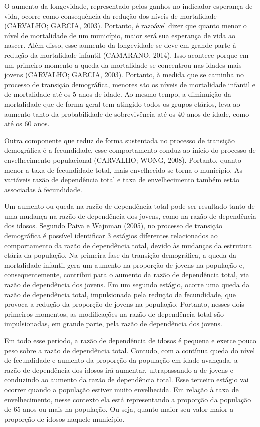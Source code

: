 \documentclass[10pt,twoside]{article}
\begin{document}
O aumento da longevidade, representado pelos ganhos no indicador esperança de vida, ocorre como consequência da redução dos níveis de mortalidade (CARVALHO; GARCIA, 2003). Portanto, é razoável dizer que quanto menor o nível de mortalidade de um município, maior será sua esperança de vida ao nascer. Além disso, esse aumento da longevidade se deve em grande parte à redução da mortalidade infantil (CAMARANO, 2014). Isso acontece porque em um primeiro momento a queda da mortalidade se concentrou nas idades mais jovens (CARVALHO; GARCIA, 2003). Portanto, à medida que se caminha no processo de transição demográfica, menores são os níveis de mortalidade infantil e de mortalidade até os 5 anos de idade. Ao mesmo tempo, a diminuição da mortalidade que de forma geral tem atingido todos os grupos etários, leva ao aumento tanto da probabilidade de sobrevivência até os 40 anos de idade, como até os 60 anos. 

Outra componente que reduz de forma sustentada no processo de transição demográfica é a fecundidade, esse comportamento conduz ao início do processo de envelhecimento populacional (CARVALHO; WONG, 2008). Portanto, quanto menor a taxa de fecundidade total, mais envelhecido se torna o município. As variáveis razão de dependência total e taxa de envelhecimento também estão associadas à fecundidade. 


Um aumento ou queda na razão de dependência total pode ser resultado tanto de uma mudança na razão de dependência dos jovens, como na razão de dependência dos idosos. Segundo Paiva e Wajnman (2005), no processo de transição demográfica é possível identificar 3 estágios diferentes relacionados ao comportamento da razão de dependência total, devido às mudanças da estrutura etária da população. Na primeira fase da transição demográfica, a queda da mortalidade infantil gera um aumento na proporção de jovens na população e, consequentemente, contribui para o aumento da razão de dependência total, via razão de dependência dos jovens. Em um segundo estágio, ocorre uma queda da razão de dependência total, impulsionada pela redução da fecundidade, que provoca a redução da proporção de jovens na população. Portanto, nesses dois primeiros momentos, as modificações na razão de dependência total são impulsionadas, em grande parte, pela razão de dependência dos jovens.

Em todo esse período, a razão de dependência de idosos é pequena e exerce pouco peso sobre a razão de dependência total. Contudo, com a contínua queda do nível de fecundidade e aumento da proporção da população em idade avançada, a razão de dependência dos idosos irá aumentar, ultrapassando a de jovens e conduzindo ao aumento da razão de dependência total. Esse terceiro estágio vai ocorrer quando a população estiver muito envelhecida. Em relação à taxa de envelhecimento, nesse contexto ela está representando a proporção da população de 65 anos ou mais na população. Ou seja, quanto maior seu valor maior a proporção de idosos naquele município.
\end{document}
